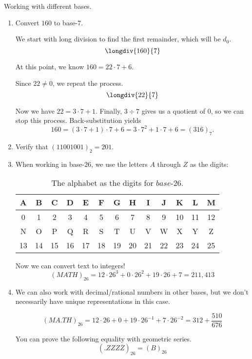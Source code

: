 \begin{example} Working with different bases.
\begin{enumerate}[(1)]
\item Convert $160$ to base-$7$.

We start with long division to find the first remainder, which will be $d_0$.
\[\longdiv{160}{7}\]

At this point, we know $160 = 22\cdot 7 + 6$.

Since $22 \not = 0$, we repeat the process.
\[\longdiv{22}{7}\]

Now we have $22 = 3 \cdot 7 + 1$.  Finally, $3 \div 7$ gives us a quotient of $0$, so we can stop this process.  Back-substitution yields
\[160 = (3\cdot 7 + 1)\cdot 7 + 6 = 3\cdot 7^2 + 1 \cdot 7 + 6 = (316)_7.\]

\item Verify that $(11001001)_2 = 201$.

\item When working in base-$26$, we use the letters $A$ through $Z$ as the digits:

\begin{table}[!h]\label{tab:base26digits}
\centering
\begin{small}
\begin{tabular}{|c|c|c|c|c|c|c|c|c|c|c|c|c|}
\hline
 A & B & C & D & E & F & G & H & I& J & K & L &M  \\
 \hline
0 & 1& 2 & 3 & 4 & 5 & 6 & 7 & 8 & 9 & 10 & 11 & 12 \\
\hline
\hline
N&O&P&Q&R&S&T&U&V&W&X&Y&Z\\
\hline
13 & 14 & 15 & 16 & 17 & 18 & 19 & 20 & 21 & 22 & 23 & 24 & 25\\
\hline
\end{tabular}
\caption{The alphabet as the digits for $base$-26.}
\end{small}
\end{table}

Now we can convert text to integers! \[
(MATH)_{26} = 12\cdot 26^3 + 0 \cdot 26^2 + 19\cdot26 + 7 = 211,413 \]

\item We can also work with decimal/rational numbers in other bases, but we don't necessarily have unique representations in this case.

\[(MA.TH)_{26} = 12\cdot 26 + 0 + 19 \cdot 26^{-1} + 7 \cdot 26^{-2} = 312 + \frac{510}{676}\]

You can prove the following equality with geometric series.
\[(.ZZZ\overline{Z})_{26} = (B)_{26}\]

\end{enumerate}
\end{example}

